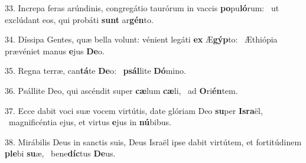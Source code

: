 33. Increpa feras arúndinis, congregátio taurórum in vaccis \textbf{po}pu\textbf{ló}rum: \ast\  ut exclúdant eos, qui probáti \textbf{sunt} ar\textbf{gén}to.\

34. Díssipa Gentes, quæ bella volunt: vénient legáti \textbf{ex} Æ\textbf{gýp}to: \ast\  Æthiópia prævéniet manus \textbf{e}jus \textbf{De}o.\

35. Regna terræ, can\textbf{tá}te \textbf{De}o: \ast\  \textbf{psál}lite \textbf{Dó}mino.\

36. Psállite Deo, qui ascéndit super \textbf{cæ}lum \textbf{cæ}li, \ast\  ad \textbf{O}ri\textbf{én}tem.\

37. Ecce dabit voci suæ vocem virtútis, date glóriam Deo \textbf{su}per \textbf{Is}\textbf{ra}ël, \ast\  magnificéntia ejus, et virtus \textbf{e}jus in \textbf{nú}bibus.\

38. Mirábilis Deus in sanctis suis, Deus Israël ipse dabit virtútem, et fortitúdinem \textbf{ple}bi \textbf{su}æ, \ast\  bene\textbf{díc}tus \textbf{De}us.\


